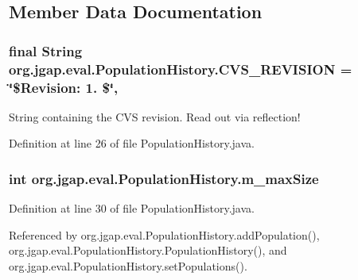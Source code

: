 \subsection{Member Data Documentation}
\hypertarget{classorg_1_1jgap_1_1eval_1_1_population_history_a90a02384916744cab78435afc457a9fa}{
\subsubsection[{C\-V\-S\-\_\-\-R\-E\-V\-I\-S\-I\-O\-N}]{\setlength{\rightskip}{0pt plus 5cm}final String org.\-jgap.\-eval.\-Population\-History.\-C\-V\-S\-\_\-\-R\-E\-V\-I\-S\-I\-O\-N = \char`\"{}\$Revision\-: 1. \$\char`\"{}\hspace{0.3cm}{\ttfamily [static]}, {\ttfamily [private]}}}\label{classorg_1_1jgap_1_1eval_1_1_population_history_a90a02384916744cab78435afc457a9fa}
String containing the C\-V\-S revision. Read out via reflection! 

Definition at line 26 of file Population\-History.\-java.

\hypertarget{classorg_1_1jgap_1_1eval_1_1_population_history_a5474fc1e289606b95c8d895ca41b3c7d}{
\subsubsection[{m\-\_\-max\-Size}]{\setlength{\rightskip}{0pt plus 5cm}int org.\-jgap.\-eval.\-Population\-History.\-m\-\_\-max\-Size\hspace{0.3cm}{\ttfamily [private]}}}\label{classorg_1_1jgap_1_1eval_1_1_population_history_a5474fc1e289606b95c8d895ca41b3c7d}


Definition at line 30 of file Population\-History.\-java.



Referenced by org.\-jgap.\-eval.\-Population\-History.\-add\-Population(), org.\-jgap.\-eval.\-Population\-History.\-Population\-History(), and org.\-jgap.\-eval.\-Population\-History.\-set\-Populations().

